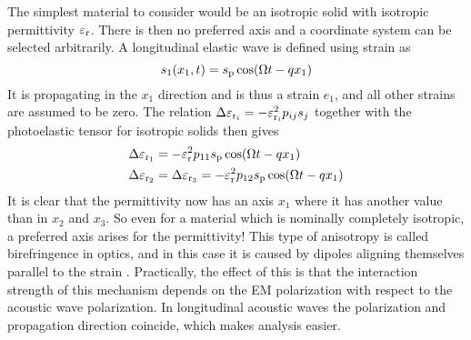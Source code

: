 \documentclass[11pt,twoside]{eitExjobb}
\begin{document}
	The simplest material to consider would be an isotropic solid with isotropic permittivity $\varepsilon_{\mathrm{r}}$. There is then no preferred axis and a coordinate system can be selected arbitrarily. A longitudinal elastic wave is defined using strain as
	\begin{equation*}
		s_1(x_1,t) = s_{\mathrm{p}} \cos(\Omega t - qx_1)
	\end{equation*}
	It is propagating in the $x_1$ direction and is thus a strain $e_1$, and all other strains are assumed to be zero. The relation $\Delta \varepsilon_{\mathrm{r}_i} = -\varepsilon_{\mathrm{r}_i}^2 p_{ij} s_j$ together with the photoelastic tensor for isotropic solids then gives
	\begin{align*}
		\Delta \varepsilon_{\mathrm{r}_1} &= -\varepsilon_{\mathrm{r}}^2 p_{11} s_{\mathrm{p}} \cos(\Omega t - qx_1)\\
		\Delta \varepsilon_{\mathrm{r}_2} &= \Delta \varepsilon_{\mathrm{r}_3} = -\varepsilon_{\mathrm{r}}^2 p_{12} s_{\mathrm{p}} \cos(\Omega t - qx_1)
	\end{align*}
	It is clear that the permittivity now has an axis $x_1$ where it has another value than in $x_2$ and $x_3$. So even for a material which is nominally completely isotropic, a preferred axis arises for the permittivity! This type of anisotropy is called birefringence in optics, and in this case it is caused by dipoles aligning themselves parallel to the strain \cite{Korpel1988}. Practically, the effect of this is that the interaction strength of this mechanism depends on the EM polarization with respect to the acoustic wave polarization. In longitudinal acoustic waves the polarization and propagation direction coincide, which makes analysis easier.
	
\end{document}
